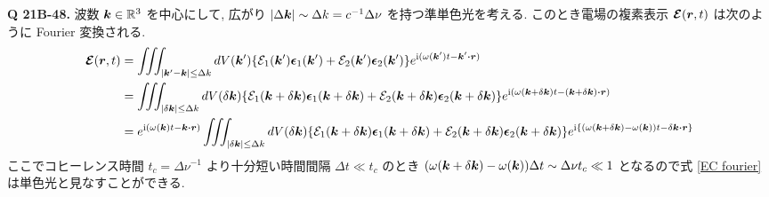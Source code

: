 \documentclass[uplatex,a4paper,dvipdfmx]{jsarticle}
\theoremstyle{definition}
\begin{document}
\textbf{Q 21B-48.}
波数 $\vb*{k}\in\mathbb{R}^3$ を中心にして, 広がり $|\Delta\vb*{k}|\sim\Delta k = c^{-1}\Delta\nu$ を持つ準単色光を考える. このとき電場の複素表示 $\vb*{\mathcal{E}}(\vb*{r}, t)$ は次のように Fourier 変換される.
\begin{align}
  \EC(\rr, t)
   & = \iiint_{|\kk' - \kk|\leq\Delta k}dV(\kk')\qty{\Ec_1(\kk')\ee_1(\kk') + \Ec_2(\kk')\ee_2(\kk')}e^{\ii(\omega(\kk')t - \kk'\vdot\rr)}                                                                                                                                           \\
   & = \iiint_{|\delta\kk|\leq\Delta k}dV(\delta\kk)\qty{\Ec_1(\kk + \delta\kk)\ee_1(\kk + \delta\kk) + \Ec_2(\kk + \delta\kk)\ee_2(\kk + \delta\kk)}e^{\ii(\omega(\kk + \delta\kk)t - (\kk + \delta\kk)\vdot\rr)}                                                                   \\
   & = e^{\ii(\omega(\kk)t - \kk\vdot\rr)}\iiint_{|\delta\kk|\leq\Delta k}dV(\delta\kk)\qty{\Ec_1(\kk + \delta\kk)\ee_1(\kk + \delta\kk) + \Ec_2(\kk + \delta\kk)\ee_2(\kk + \delta\kk)}e^{\ii\qty{(\omega(\kk + \delta\kk) - \omega(\kk))t - \delta\kk\vdot\rr}} \label{EC fourier} \\
\end{align}
ここでコヒーレンス時間 $t_c = \Delta\nu^{-1}$ より十分短い時間間隔 $\Delta t \ll t_c$ のとき $(\omega(\vb*{k} + \delta\vb*{k}) - \omega(\vb*{k}))\Delta t \sim \Delta\nu t_c \ll 1$ となるので式 \eqref{EC fourier} は単色光と見なすことができる. \\
\end{document}
